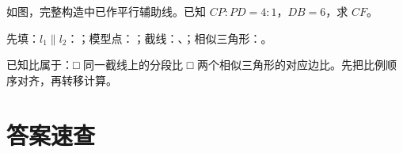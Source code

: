 \documentclass{exam-zh}
\newcounter{solstep}
\begin{document}

\begin{problem}[points=10]
  \noindent
  \begin{minipage}[t]{\dimexpr\linewidth-60mm-6mm\relax}
    \vspace{0pt}
    如图，完整构造中已作平行辅助线。已知 $CP:PD=4:1$，$DB=6$，求 $CF$。

先填：$l_1\parallel l_2$：\underline{\hspace{1.5cm}}；模型点：\underline{\hspace{0.8cm}}；截线：\underline{\hspace{1.3cm}}、\underline{\hspace{1.3cm}}；相似三角形：\underline{\hspace{3cm}}。

已知比属于：□ 同一截线上的分段比 \quad □ 两个相似三角形的对应边比。先把比例顺序对齐，再转移计算。


  \end{minipage}\hfill
  \begin{diagramcoltikz}{60mm}{第 4 题图}
  }
  \end{diagramcoltikz}
  \par\medskip
  \answerarea[34mm]
  \setcounter{solstep}{0}
  \begin{solutionblock}
  \end{solutionblock}
\end{problem}


\clearpage
\section*{答案速查}
\end{document}
